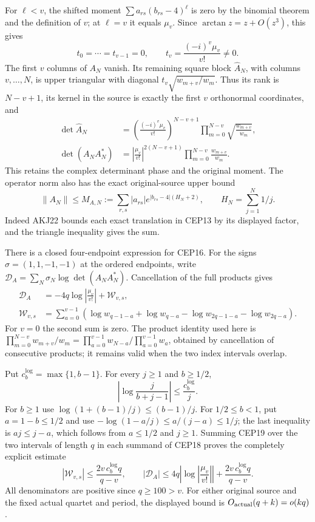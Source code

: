 \documentclass[11pt,a4paper]{article}
\begin{document}
For $\ell<v$, the shifted moment
$\sum a_{rs}(b_{rs}-4)^\ell$ is zero by the binomial theorem and
the definition of $v$; at $\ell=v$ it equals $\mu_v$.
Since $\arctan z=z+O(z^3)$, this gives
\[
 t_0=\cdots=t_{v-1}=0,\qquad
 t_v=\frac{(-i)^v\mu_v}{v!}\ne0.
 \tag{CEP15}
\]
The first $v$ columns of $A_N$ vanish. Its remaining square block
$\widehat A_N$, with columns $v,\ldots,N$, is upper triangular
with diagonal $t_v\sqrt{w_{m+v}/w_m}$.
Thus its rank is $N-v+1$, its kernel in the source is exactly
the first $v$ orthonormal coordinates, and
\[
 \begin{split}
 \det\widehat A_N
   &=\left(\frac{(-i)^v\mu_v}{v!}\right)^{N-v+1}
                   \prod_{m=0}^{N-v}\sqrt{\frac{w_{m+v}}{w_m}},\\
 \det(A_NA_N^*)
   &=\left|\frac{\mu_v}{v!}\right|^{2(N-v+1)}
                   \prod_{m=0}^{N-v}\frac{w_{m+v}}{w_m}.
 \end{split}\tag{CEP16}
\]
This retains the complex determinant phase and the original moment.
The operator norm also has the exact original-source upper bound
\[
 \|A_N\|\le
 M_{A,N}:=\sum_{r,s}|a_{rs}|
               e^{|b_{rs}-4|(H_N+2)},\qquad
 H_N=\sum_{j=1}^N1/j.
 \tag{CEP17}
\]
Indeed AKJ22 bounds each exact translation in CEP13 by its
displayed factor, and the triangle inequality gives the sum.

There is a closed four-endpoint expression for CEP16. For the
signs $\sigma=(1,1,-1,-1)$ at the ordered endpoints, write
$\mathcal D_A=\sum_N\sigma_N\log\det(A_NA_N^*)$.
Cancellation of the full products gives
\[
 \begin{split}
 \mathcal D_A
  &=-4q\log\left|\frac{\mu_v}{v!}\right|+\mathcal W_{v,s},\\
 \mathcal W_{v,s}
  &=\sum_{a=0}^{v-1}\left(
      \log w_{q-1-a}+\log w_{q-a}
      -\log w_{2q-1-a}-\log w_{2q-a}\right).
 \end{split}\tag{CEP18}
\]
For $v=0$ the second sum is zero. The product identity used here is
$\prod_{m=0}^{N-v}w_{m+v}/w_m
 =\prod_{a=0}^{v-1}w_{N-a}/\prod_{a=0}^{v-1}w_a$,
obtained by cancellation of consecutive products; it remains
valid when the two index intervals overlap.

Put $c_b^{\log}=\max\{1,b-1\}$. For every $j\ge1$ and $b\ge1/2$,
\[
 \left|\log\frac{j}{b+j-1}\right|\le\frac{c_b^{\log}}j .
 \tag{CEP19}
\]
For $b\ge1$ use $\log(1+(b-1)/j)\le(b-1)/j$.
For $1/2\le b<1$, put $a=1-b\le1/2$ and use
$-\log(1-a/j)\le a/(j-a)\le1/j$; the last inequality is
$aj\le j-a$, which follows from $a\le1/2$ and $j\ge1$.
Summing CEP19 over the two intervals of length $q$ in each
summand of CEP18 proves the completely explicit estimate
\[
 |\mathcal W_{v,s}|
 \le \frac{2v\,c_b^{\log}q}{q-v},\qquad
 |\mathcal D_A|
 \le4q\left|\log\left|\frac{\mu_v}{v!}\right|\right|
             +\frac{2v\,c_b^{\log}q}{q-v}.
 \tag{CEP20}
\]
All denominators are positive since $q\ge100>v$.
For either original source and the fixed actual quartet and period,
the displayed bound is $O_{\rm actual}(q+k)=o(kq)$.
\end{document}
